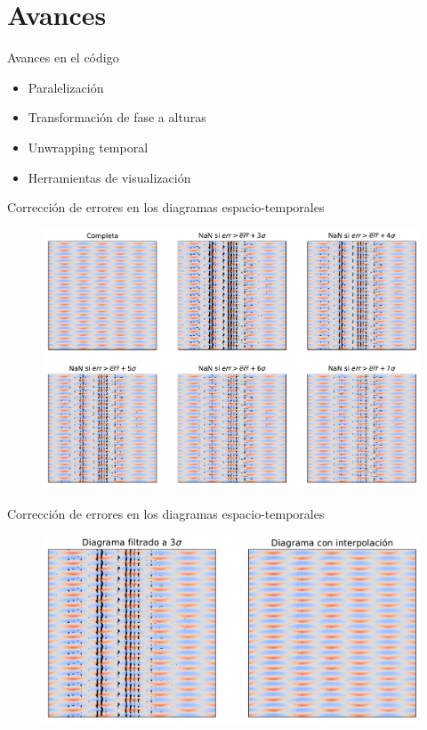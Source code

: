 \documentclass[aspectratio=169]{beamer}
\begin{document}
\section{Avances}

\begin{frame}{Avances en el código}
	\begin{itemize} 
		\item Paralelización
			\vspace{0.8cm}
		\item Transformación de fase a alturas
			\vspace{0.8cm}
		\item Unwrapping temporal
			\vspace{0.8cm}
		\item Herramientas de visualización
	\end{itemize}
\end{frame}

\begin{frame}{Corrección de errores en los diagramas espacio-temporales}
	\begin{figure}[ht]
		\includegraphics[width=0.75\linewidth]{figs/error_analysis.pdf}
	\end{figure}
\end{frame}
\begin{frame}{Corrección de errores en los diagramas espacio-temporales}
	\begin{figure}[ht]
		\includegraphics[width=0.8\linewidth]{figs/error_interp.pdf}
	\end{figure}
\end{frame}
\end{document}
